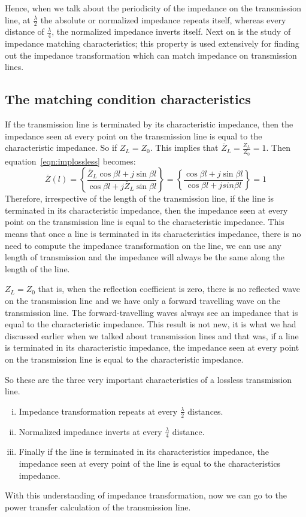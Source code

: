 Hence, when we talk about the periodicity of the impedance on the transmission line, at $\frac{\lambda}{2}$ the absolute or normalized impedance repeats itself, whereas every distance of $\frac{\lambda}{4}$, the normalized impedance inverts itself. Next on is the study of impedance matching characteristics; this property is used extensively for finding out the impedance transformation which can match impedance on transmission lines.

\subsection{The matching condition characteristics}
If the transmission line is terminated by its characteristic impedance, then the impedance seen at every point on the transmission line is equal to the characteristic impedance. So if $Z_L=Z_0$. This implies that $\bar{Z}_L= \frac{Z_L}{Z_0}=1$. Then equation~\eqref{eqn:implossless} becomes:
\begin{dmath*}
\bar{Z}(l) = \left\lbrace\frac{\bar{Z}_L\cos\beta l + j\sin\beta l}{\cos\beta l + j\bar{Z}_L\sin\beta l}\right\rbrace = \left\lbrace \frac{\cos\beta l + j\sin\beta l}{\cos\beta l + jsin\beta l}\right\rbrace = 1
\end{dmath*}
Therefore, irrespective of the length of the transmission line, if the line is terminated in its characteristic impedance, then the impedance seen at every point on the transmission line is equal to the characteristic impedance. This means that once a line is terminated in its characteristics impedance, there is no need to compute the impedance transformation on the line, we can use any length of transmission and the impedance will always be the same along the length of the line. 

$Z_L=Z_0$ that is, when the reflection coefficient is zero, there is no reflected wave on the transmission line and we have only a forward travelling wave on the transmission line. The forward-travelling waves always see an impedance that is equal to the characteristic impedance. This result is not new, it is what we had discussed earlier when we talked about transmission lines and that was, if a line is terminated in its characteristic impedance, the impedance seen at every point on the transmission line is equal to the characteristic impedance.

So these are the three very important characteristics of a lossless transmission line.
\begin{enumerate}[(i)]
\item Impedance transformation repeats at every $\frac{\lambda}{2}$ distances.
\item Normalized impedance inverts at every $\frac{\lambda}{4}$ distance.
\item Finally if the line is terminated in its characteristics impedance, the impedance seen at every point of the line is equal to the characteristics impedance.
\end{enumerate}
With this understanding of impedance transformation, now we can go to the power transfer calculation of the transmission line.

